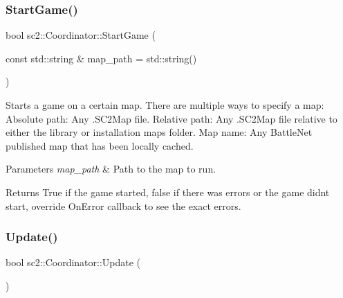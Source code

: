 \subsubsection{\texorpdfstring{Start\+Game()}{StartGame()}}
{\footnotesize\ttfamily bool sc2\+::\+Coordinator\+::\+Start\+Game (\begin{DoxyParamCaption}\item[{const std\+::string \&}]{map\+\_\+path = {\ttfamily std\+:\+:string()} }\end{DoxyParamCaption})}

Starts a game on a certain map. There are multiple ways to specify a map\+: Absolute path\+: Any .S\+C2\+Map file. Relative path\+: Any .S\+C2\+Map file relative to either the library or installation maps folder. Map name\+: Any Battle\+Net published map that has been locally cached. 
\begin{DoxyParams}{Parameters}
{\em map\+\_\+path} & Path to the map to run. \\
\hline
\end{DoxyParams}
\begin{DoxyReturn}{Returns}
True if the game started, false if there was errors or the game didn\textquotesingle{}t start, override On\+Error callback to see the exact errors. 
\end{DoxyReturn}
\mbox{\label{classsc2_1_1_coordinator_af70ba5246f9d447eb8a69cd76d364eee}} 
\subsubsection{\texorpdfstring{Update()}{Update()}}
{\footnotesize\ttfamily bool sc2\+::\+Coordinator\+::\+Update (\begin{DoxyParamCaption}{ }\end{DoxyParamCaption})}

